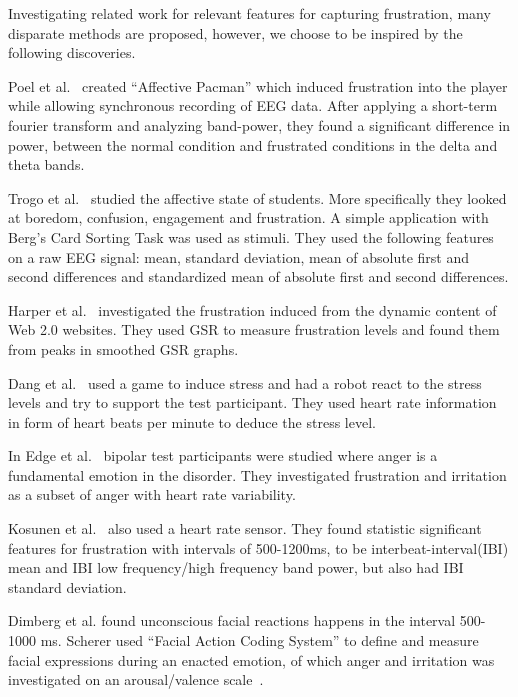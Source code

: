 Investigating related work for relevant features for capturing frustration, many disparate methods are proposed, however,
we choose to be inspired by the following discoveries.

Poel et al.~\cite{affective_pacman} created ``Affective Pacman'' which induced frustration into the player while allowing synchronous recording of EEG data. After applying a short-term fourier transform and analyzing band-power, they found a significant difference in power, between the normal condition and frustrated conditions in the delta and theta bands.

Trogo et al.~\cite{brainwave_signals_frustration} studied the affective state of students. More specifically they looked at boredom, confusion, engagement and frustration. 
A simple application with Berg's Card Sorting Task\cite{bergs_card_sorting} was used as stimuli.
They used the following features on a raw EEG signal: mean, standard deviation, mean of absolute first and second differences and standardized mean of absolute first and second differences.

Harper et al.~\cite{web20_frustration} investigated the frustration induced from the dynamic content of Web 2.0 websites. 
They used GSR to measure frustration levels and found them from peaks in smoothed GSR graphs.

Dang et al.~\cite{stress_robot} used a game to induce stress and had a robot react to the stress levels and try to support the test participant. 
They used heart rate information in form of heart beats per minute to deduce the stress level.

In Edge et al.~\cite{bipolar_frustration} bipolar test participants were studied where anger is a fundamental emotion in the disorder. 
They investigated frustration and irritation as a subset of anger with heart rate variability.

Kosunen et al.~\cite{boredom_negative_mood_features} also used a heart rate sensor.
They found statistic significant features for frustration with intervals of 500-1200ms, to be interbeat-interval(IBI) mean and IBI low frequency/high frequency band power, but also had IBI standard deviation.

Dimberg et al. \cite{face_onset} found unconscious facial reactions happens in the interval 500-1000 ms.
Scherer used ``Facial Action Coding System'' to define and measure facial expressions during an enacted emotion, of which anger and irritation was investigated on an arousal/valence scale~\cite{scherer_kinect}.


